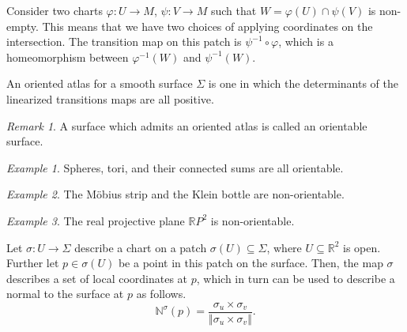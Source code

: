\documentclass[11pt]{article}
\newcommand{\R}{\mathbb{R}}
\newcommand{\N}{\mathbb{N}}
\newcommand{\norm}[1]{\Vert #1 \Vert}
\theoremstyle{definition}
\theoremstyle{remark}
\newtheorem*{remark}{Remark}
\newtheorem*{example}{Example}
\numberwithin{equation}{section}
\begin{document}
    \begin{definition}
        Consider two charts $\varphi\colon U \to M$, $\psi\colon V \to M$ such that
        $W = \varphi(U) \cap \psi(V)$ is non-empty. This means that we have two
        choices of applying coordinates on the intersection. The transition map on
        this patch is $\psi^{-1}\circ \varphi$, which is a homeomorphism between
        $\varphi^{-1}(W)$ and $\psi^{-1}(W)$.
    \end{definition}

    \begin{definition}
        An oriented atlas for a smooth surface $\Sigma$ is one in which the
        determinants of the linearized transitions maps are all positive.
        \begin{remark}
            A surface which admits an oriented atlas is called an orientable surface.
        \end{remark}
    \end{definition}

    \begin{example}
        Spheres, tori, and their connected sums are all orientable.
    \end{example}
    \begin{example}
        The M\"obius strip and the Klein bottle are non-orientable.
    \end{example}
    \begin{example}
        The real projective plane $\R P^2$ is non-orientable.
    \end{example}

    \begin{definition}
        Let $\sigma\colon U \to \Sigma$ describe a chart on a patch $\sigma(U)
        \subseteq \Sigma$, where $U \subseteq \R^2$ is open. Further let $p \in
        \sigma(U)$ be a point in this patch on the surface. Then, the map $\sigma$
        describes a set of local coordinates at $p$, which in turn can be used to
        describe a normal to the surface at $p$ as follows. \[
            \N^\sigma(p) = \frac{\sigma_u\times \sigma_v}{\norm{\sigma_u \times
            \sigma_v}}.
        \]
    \end{definition}
\end{document}
